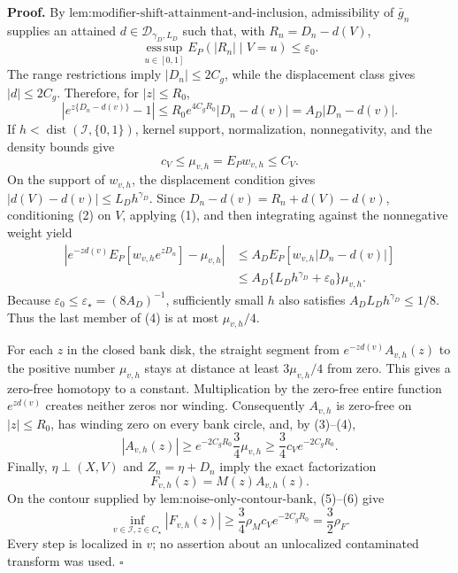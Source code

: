 \textbf{Proof.}
By \(\text{lem:modifier-shift-attainment-and-inclusion}\), admissibility of \(\bar g_n\) supplies an attained \(d\in\mathcal D_{\gamma_D,L_D}\) such that, with \(R_n=D_n-d(V)\),
\[
 \operatorname*{ess\,sup}_{u\in[0,1]}E_P(|R_n|\mid V=u)\le\varepsilon_0. \tag{1}
\]
The range restrictions imply \(|D_n|\le2C_g\), while the displacement class gives \(|d|\le2C_g\).  Therefore, for \(|z|\le R_0\),
\[
 \left|e^{z\{D_n-d(v)\}}-1\right|
 \le R_0e^{4C_gR_0}|D_n-d(v)|=A_D|D_n-d(v)|. \tag{2}
\]
If \(h<\operatorname{dist}(\mathcal I,\{0,1\})\), kernel support, normalization, nonnegativity, and the density bounds give
\[
 c_V\le\mu_{v,h}=E_Pw_{v,h}\le C_V. \tag{3}
\]
On the support of \(w_{v,h}\), the displacement condition gives \(|d(V)-d(v)|\le L_Dh^{\gamma_D}\).  Since
\(D_n-d(v)=R_n+d(V)-d(v)\), conditioning (2) on \(V\), applying (1), and then integrating against the nonnegative weight yield
\[
 \begin{aligned}
 \left|e^{-zd(v)}E_P[w_{v,h}e^{zD_n}]-\mu_{v,h}\right|
 &\le A_DE_P[w_{v,h}|D_n-d(v)|]\\
 &\le A_D\{L_Dh^{\gamma_D}+\varepsilon_0\}\mu_{v,h}. 
 \end{aligned} \tag{4}
\]
Because \(\varepsilon_0\le\varepsilon_\star=(8A_D)^{-1}\), sufficiently small \(h\) also satisfies \(A_DL_Dh^{\gamma_D}\le1/8\).  Thus the last member of (4) is at most \(\mu_{v,h}/4\).

For each \(z\) in the closed bank disk, the straight segment from \(e^{-zd(v)}A_{v,h}(z)\) to the positive number \(\mu_{v,h}\) stays at distance at least \(3\mu_{v,h}/4\) from zero.  This gives a zero-free homotopy to a constant.  Multiplication by the zero-free entire function \(e^{zd(v)}\) creates neither zeros nor winding.  Consequently \(A_{v,h}\) is zero-free on \(|z|\le R_0\), has winding zero on every bank circle, and, by (3)--(4),
\[
 |A_{v,h}(z)|
 \ge e^{-2C_gR_0}\frac34\mu_{v,h}
 \ge\frac34c_Ve^{-2C_gR_0}. \tag{5}
\]
Finally, \(\eta\perp(X,V)\) and \(Z_n=\eta+D_n\) imply the exact factorization
\[
 F_{v,h}(z)=M(z)A_{v,h}(z). \tag{6}
\]
On the contour supplied by \(\text{lem:noise-only-contour-bank}\), (5)--(6) give
\[
 \inf_{v\in\mathcal I,z\in C_\star}|F_{v,h}(z)|
 \ge\frac34\rho_Mc_Ve^{-2C_gR_0}
 =\frac32\rho_F. \tag{7}
\]
Every step is localized in \(v\); no assertion about an unlocalized contaminated transform was used. \(\square\)